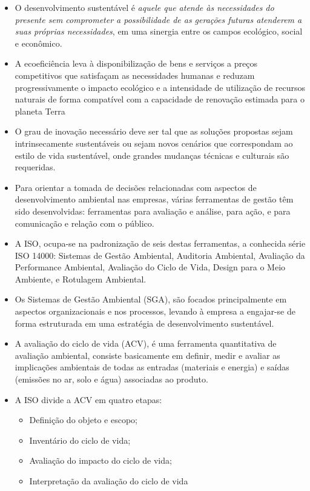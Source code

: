 \documentclass{article}
\begin{document}
\begin{itemize}
    \item O desenvolvimento sustentável é \textit{aquele que atende às necessidades do presente sem comprometer a possibilidade de as gerações futuras atenderem a suas próprias necessidades}, em uma sinergia entre os campos ecológico, social e econômico. 
    \item A ecoeficiência leva à disponibilização de bens e serviços a preços competitivos que satisfaçam as necessidades humanas e reduzam progressivamente o impacto ecológico e a intensidade de utilização de recursos naturais de forma compatível com a capacidade de renovação estimada para o planeta Terra 
    \item O grau de inovação necessário deve ser tal que as soluções propostas sejam intrinsecamente sustentáveis ou sejam novos cenários que correspondam ao estilo de vida sustentável, onde grandes mudanças técnicas e culturais são requeridas. 
    \item Para orientar a tomada de decisões relacionadas com aspectos de desenvolvimento ambiental nas empresas, várias ferramentas de gestão têm sido desenvolvidas: ferramentas para avaliação e análise, para ação, e para comunicação e relação com o público. 
    \item A ISO, ocupa-se na padronização de seis destas ferramentas, a conhecida série ISO 14000: Sistemas de Gestão Ambiental, Auditoria Ambiental, Avaliação da Performance Ambiental, Avaliação do Ciclo de Vida, Design para o Meio Ambiente, e Rotulagem Ambiental. 
    \item Os Sistemas de Gestão Ambiental (SGA), são focados principalmente em aspectos organizacionais e nos processos, levando à empresa a engajar-se de forma estruturada em uma estratégia de desenvolvimento sustentável. 
    \item A avaliação do ciclo de vida (ACV), é uma ferramenta quantitativa de avaliação ambiental, consiste basicamente em definir, medir e avaliar as implicações ambientais de todas as entradas (materiais e energia) e saídas (emissões no ar, solo e água) associadas ao produto. 
    \item A ISO divide a ACV em quatro etapas:
    \begin{itemize}
        \item Definição do objeto e escopo; 
        \item Inventário do ciclo de vida; 
        \item Avaliação do impacto do ciclo de vida; 
        \item Interpretação da avaliação do ciclo de vida

\end{itemize}
\end{itemize}
\end{document}
